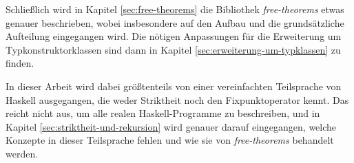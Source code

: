 



Schließlich wird in Kapitel \ref{sec:free-theorems} die Bibliothek \textit{free-theorems} etwas genauer beschrieben, wobei
insbesondere auf den Aufbau und die grundsätzliche Aufteilung eingegangen wird. Die nötigen Anpassungen für die Erweiterung um
Typkonstruktorklassen sind dann in Kapitel \ref{sec:erweiterung-um-typklassen} zu finden.

In dieser Arbeit wird dabei größtenteils von einer vereinfachten Teilsprache von Haskell ausgegangen, die weder Striktheit noch den Fixpunktoperator kennt. Das reicht nicht aus, um alle realen Haskell-Programme zu beschreiben, und in Kapitel \ref{sec:striktheit-und-rekursion}
wird genauer darauf eingegangen, welche Konzepte in dieser Teilsprache fehlen und wie sie von \textit{free-theorems} behandelt
werden.

